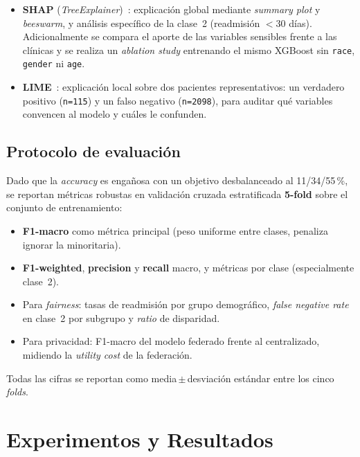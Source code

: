 \documentclass[11pt,a4paper]{article}
\begin{document}
\begin{itemize}
    \item \textbf{SHAP} (\textit{TreeExplainer})~\cite{ref_shap}: explicación global mediante \textit{summary plot} y \textit{beeswarm}, y análisis específico de la clase~2 (readmisión $<$30 días). Adicionalmente se compara el aporte de las variables sensibles frente a las clínicas y se realiza un \textit{ablation study} entrenando el mismo XGBoost sin \texttt{race}, \texttt{gender} ni \texttt{age}.
    \item \textbf{LIME}~\cite{ref_lime}: explicación local sobre dos pacientes representativos: un verdadero positivo (\texttt{n=115}) y un falso negativo (\texttt{n=2098}), para auditar qué variables convencen al modelo y cuáles le confunden.
\end{itemize}

\subsection{Protocolo de evaluación}

Dado que la \textit{accuracy} es engañosa con un objetivo desbalanceado al 11/34/55\,\%, se reportan métricas robustas en validación cruzada estratificada \textbf{5-fold} sobre el conjunto de entrenamiento:
\begin{itemize}
    \item \textbf{F1-macro} como métrica principal (peso uniforme entre clases, penaliza ignorar la minoritaria).
    \item \textbf{F1-weighted}, \textbf{precision} y \textbf{recall} macro, y métricas por clase (especialmente clase~2).
    \item Para \textit{fairness}: tasas de readmisión por grupo demográfico, \textit{false negative rate} en clase~2 por subgrupo y \textit{ratio} de disparidad.
    \item Para privacidad: F1-macro del modelo federado frente al centralizado, midiendo la \textit{utility cost} de la federación.
\end{itemize}
Todas las cifras se reportan como media\,$\pm$\,desviación estándar entre los cinco \textit{folds}.


\section{Experimentos y Resultados}
\label{sec:resultados}
\end{document}
